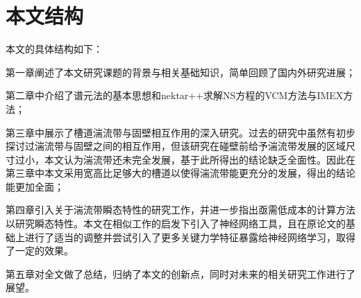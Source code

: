 %
%
%
%
\section{本文结构}
本文的具体结构如下：

第一章阐述了本文研究课题的背景与相关基础知识，简单回顾了国内外研究进展；

第二章中介绍了谱元法的基本思想和nektar++求解NS方程的VCM方法与IMEX方法；

第三章中展示了槽道湍流带与固壁相互作用的深入研究。过去的研究中虽然有初步探讨过湍流带与固壁之间的相互作用，但该研究在碰壁前给予湍流带发展的区域尺寸过小，本文认为湍流带还未完全发展，基于此所得出的结论缺乏全面性。因此在第三章中本文采用宽高比足够大的槽道以使得湍流带能更充分的发展，得出的结论能更加全面；

第四章引入关于湍流带瞬态特性的研究工作，并进一步指出亟需低成本的计算方法以研究瞬态特性。本文在相似工作的启发下引入了神经网络工具，且在原论文的基础上进行了适当的调整并尝试引入了更多关键力学特征暴露给神经网络学习，取得了一定的效果。

第五章对全文做了总结，归纳了本文的创新点，同时对未来的相关研究工作进行了展望。

